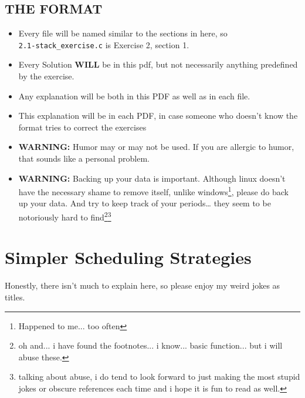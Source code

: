 \documentclass[a4paper, 11pt]{article}
\begin{document}
    \subsection*{THE FORMAT}
    \begin{itemize}
      \item Every file will be named similar to the sections in here, so\\
      \texttt{2.1-stack\_exercise.c} is Exercise 2, section 1.
      \item Every Solution \textbf{WILL} be in this pdf, but not necessarily 
            anything predefined by the exercise.
      \item Any explanation will be both in this PDF as well as in each file.
      \item This explanation will be in each PDF, in case someone who doesn't
            know the format tries to correct the exercises
      \item \textbf{WARNING:} Humor may or may not be used. If you are allergic
            to humor, that sounds like a personal problem.
      \item \textbf{WARNING:} Backing up your data is important. Although linux 
            doesn't have the necessary shame to remove itself, unlike windows\footnote{Happened to me... too often},
            please do back up your data. And try to keep track of your periods\dots
            they seem to be notoriously hard to find\footnote{oh and... i have found the footnotes... i know... basic function... but i will abuse these.}\footnote{talking about abuse, i do tend to look forward to just making the most stupid jokes or obscure references each time and i hope it is fun to read as well.}
    \end{itemize}
    \newpage
    \section{Simpler Scheduling Strategies}
    Honestly, there isn't much to explain here, so please enjoy my weird jokes as titles.
\end{document}
